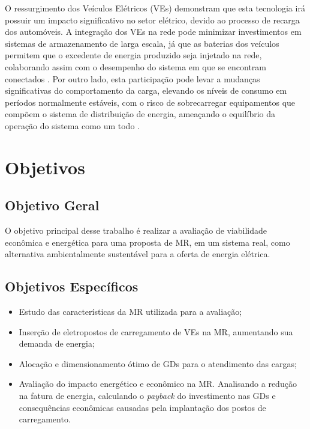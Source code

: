 \documentclass[]{IEEEphot}
\begin{document}
O ressurgimento dos Veículos Elétricos (VEs) demonstram que esta tecnologia irá possuir um impacto significativo no setor elétrico, devido ao processo de recarga dos automóveis. A integração dos VEs na rede pode minimizar investimentos em sistemas de armazenamento de larga escala, já que as baterias dos veículos permitem que o excedente de energia produzido seja injetado na rede, colaborando assim com o desempenho do sistema em que se encontram conectados \cite{Rebechi2008}. Por outro lado, esta participação pode levar a mudanças significativas do comportamento da carga, elevando os níveis de consumo em períodos normalmente estáveis, com o risco de sobrecarregar equipamentos que compõem o sistema de distribuição de energia, ameaçando o equilíbrio da operação do sistema como um todo \cite{Leou2014}.

\section{Objetivos}
\subsection{Objetivo Geral}
O objetivo principal desse trabalho é realizar a avaliação de viabilidade econômica e energética para uma proposta de MR, em um sistema real, como alternativa ambientalmente sustentável para a oferta de energia elétrica.
\subsection{Objetivos Específicos}
	\begin{itemize}
	\item Estudo das características da MR utilizada para a avaliação;
	\item Inserção de eletropostos de carregamento de VEs na MR, aumentando sua demanda de energia;
	\item Alocação e dimensionamento ótimo de GDs para o atendimento das cargas;
	\item Avaliação do impacto energético e econômico na MR. Analisando a redução na fatura de energia, calculando o \textit{payback} do investimento nas GDs e consequências econômicas causadas pela implantação dos postos de carregamento.
\end{itemize}
\end{document}
